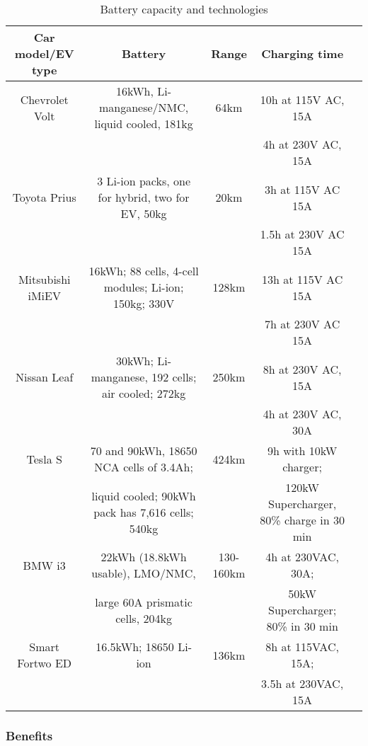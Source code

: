\documentclass[twocolumn,10pt]{IEEEtran}
\begin{document}
\begin{table*}[t]
	\caption{Battery capacity and technologies} %
	\centering %
	\begin{tabular}{|c|c|c|c|c|}
		\hline
		Car model/EV type & Battery & Range & Charging time \\
		\hline
		\hline
		Chevrolet Volt & 16kWh, Li-manganese/NMC, liquid cooled, 181kg  & 64km & 10h at 115V AC, 15A	\\
		& & &  4h at 230V AC, 15A 	\\
		\hline
		Toyota Prius & 3 Li-ion packs, one for hybrid, two for EV, 50kg & 20km&  3h at 115V AC 15A	\\
		& & &  1.5h at 230V AC 15A 	\\
		\hline
		Mitsubishi iMiEV  & 16kWh; 88 cells, 4-cell modules; Li-ion; 150kg; 330V & 128km  & 13h at 115V AC 15A 	\\
		& & &   7h at 230V AC 15A 	\\
		\hline
		Nissan Leaf  & 30kWh; Li-manganese, 192 cells; air cooled; 272kg  & 250km & 8h at 230V AC, 15A 	\\
		& & &   4h at 230V AC, 30A 	\\
		\hline
		Tesla S  & 70 and 90kWh, 18650 NCA cells of 3.4Ah;  & 424km  & 9h with 10kW charger; 	\\
		& liquid cooled; 90kWh pack has 7,616 cells;  540kg &  &   120kW Supercharger,  80\% charge in 30 min	\\
		\hline
		BMW i3  & 22kWh (18.8kWh usable), LMO/NMC,  & 130-160km & 4h at 230VAC, 30A; 	\\
		& large 60A prismatic cells,  204kg  & &   50kW Supercharger; 80\% in 30 min 	\\
		\hline
		Smart Fortwo ED  & 16.5kWh; 18650 Li-ion  & 136km & 8h at 115VAC, 15A; 	\\
		& & &   3.5h at 230VAC, 15A 	\\
		\hline
	\end{tabular}
	\label{tab:Battery capacity}
\end{table*}


\subsubsection{Benefits}
\end{document}

